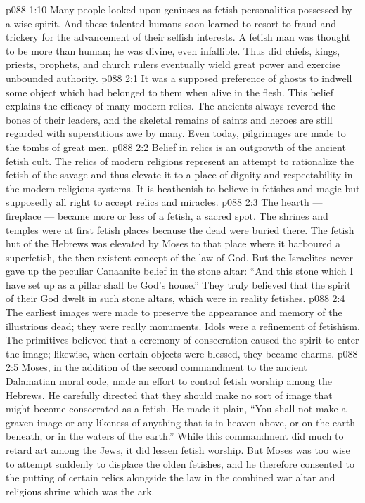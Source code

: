 \vs p088 1:10 Many people looked upon geniuses as fetish personalities possessed by a wise spirit. And these talented humans soon learned to resort to fraud and trickery for the advancement of their selfish interests. A fetish man was thought to be more than human; he was divine, even infallible. Thus did chiefs, kings, priests, prophets, and church rulers eventually wield great power and exercise unbounded authority.
\vs p088 2:1 It was a supposed preference of ghosts to indwell some object which had belonged to them when alive in the flesh. This belief explains the efficacy of many modern relics. The ancients always revered the bones of their leaders, and the skeletal remains of saints and heroes are still regarded with superstitious awe by many. Even today, pilgrimages are made to the tombs of great men.
\vs p088 2:2 Belief in relics is an outgrowth of the ancient fetish cult. The relics of modern religions represent an attempt to rationalize the fetish of the savage and thus elevate it to a place of dignity and respectability in the modern religious systems. It is heathenish to believe in fetishes and magic but supposedly all right to accept relics and miracles.
\vs p088 2:3 The hearth --- fireplace --- became more or less of a fetish, a sacred spot. The shrines and temples were at first fetish places because the dead were buried there. The fetish hut of the Hebrews was elevated by Moses to that place where it harboured a superfetish, the then existent concept of the law of God. But the Israelites never gave up the peculiar Canaanite belief in the stone altar: “And this stone which I have set up as a pillar shall be God’s house.” They truly believed that the spirit of their God dwelt in such stone altars, which were in reality fetishes.
\vs p088 2:4 \pc The earliest images were made to preserve the appearance and memory of the illustrious dead; they were really monuments. Idols were a refinement of fetishism. The primitives believed that a ceremony of consecration caused the spirit to enter the image; likewise, when certain objects were blessed, they became charms.
\vs p088 2:5 Moses, in the addition of the second commandment to the ancient Dalamatian moral code, made an effort to control fetish worship among the Hebrews. He carefully directed that they should make no sort of image that might become consecrated as a fetish. He made it plain, “You shall not make a graven image or any likeness of anything that is in heaven above, or on the earth beneath, or in the waters of the earth.” While this commandment did much to retard art among the Jews, it did lessen fetish worship. But Moses was too wise to attempt suddenly to displace the olden fetishes, and he therefore consented to the putting of certain relics alongside the law in the combined war altar and religious shrine which was the ark.
